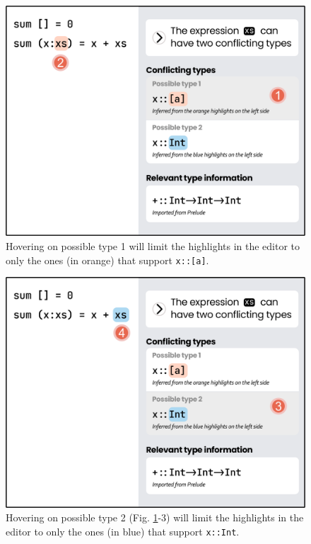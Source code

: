 \begin{figure}[h]
        \centering
        \includegraphics[width=\linewidth]{images/basic-mode-2.pdf}
        \caption{
       Hovering on possible type 1 will limit the highlights 
       in the editor to only the ones (in orange) that support \texttt{x::[a]}.
        }
        \label{fig:basic-mode-2}
\end{figure}

\begin{figure}
        \centering
        \includegraphics[width=\linewidth]{images/basic-mode-3.pdf}
        \caption{
            Hovering on possible type 2 (Fig. \ref{fig:basic-mode-2}-3) will limit the highlights 
            in the editor to only the ones (in blue) that support \texttt{x::Int}.
        }
        \label{fig:basic-mode-3}
\end{figure}





